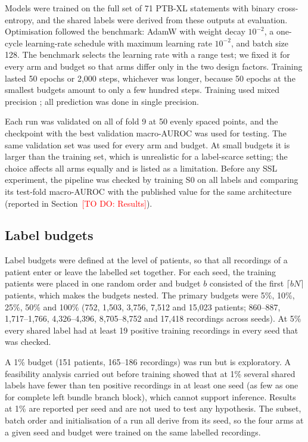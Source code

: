 \documentclass[preprint,12pt]{elsarticle}
\newcommand{\todo}[1]{\textcolor{red}{[TO DO: #1]}}
\begin{document}
Models were trained on the full set of 71 PTB-XL statements with binary cross-entropy, and the shared labels were derived from these outputs at evaluation. Optimisation followed the benchmark: AdamW \cite{loshchilov2019adamw} with weight decay $10^{-2}$, a one-cycle learning-rate schedule \cite{smith2019} with maximum learning rate $10^{-2}$, and batch size 128. The benchmark selects the learning rate with a range test; we fixed it for every arm and budget so that arms differ only in the two design factors. Training lasted 50 epochs or 2,000 steps, whichever was longer, because 50 epochs at the smallest budgets amount to only a few hundred steps. Training used mixed precision \cite{micikevicius2018}; all prediction was done in single precision.

Each run was validated on all of fold 9 at 50 evenly spaced points, and the checkpoint with the best validation macro-AUROC was used for testing. The same validation set was used for every arm and budget. At small budgets it is larger than the training set, which is unrealistic for a label-scarce setting; the choice affects all arms equally and is listed as a limitation. Before any SSL experiment, the pipeline was checked by training S0 on all labels and comparing its test-fold macro-AUROC with the published value for the same architecture \cite{mehari2022} (reported in Section~\todo{Results}).

\subsection{Label budgets}
\label{sec:budgets}

Label budgets were defined at the level of patients, so that all recordings of a patient enter or leave the labelled set together. For each seed, the training patients were placed in one random order and budget $b$ consisted of the first $\lceil bN \rceil$ patients, which makes the budgets nested. The primary budgets were 5\%, 10\%, 25\%, 50\% and 100\% (752, 1,503, 3,756, 7,512 and 15,023 patients; 860--887, 1,717--1,766, 4,326--4,396, 8,705--8,752 and 17,418 recordings across seeds). At 5\% every shared label had at least 19 positive training recordings in every seed that was checked.

A 1\% budget (151 patients, 165--186 recordings) was run but is exploratory. A feasibility analysis carried out before training showed that at 1\% several shared labels have fewer than ten positive recordings in at least one seed (as few as one for complete left bundle branch block), which cannot support inference. Results at 1\% are reported per seed and are not used to test any hypothesis. The subset, batch order and initialisation of a run all derive from its seed, so the four arms at a given seed and budget were trained on the same labelled recordings.
\end{document}

